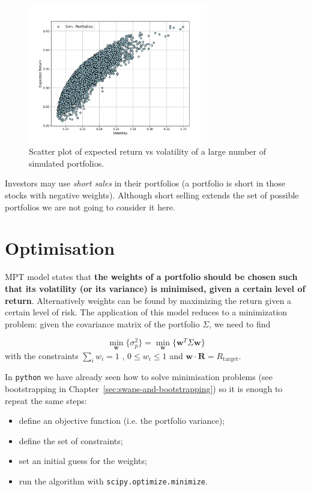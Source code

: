 \begin{figure}[hbtp]
\centering
\includegraphics[width=0.7\textwidth]{figures/return_variance}
\caption{Scatter plot of expected return vs volatility of a large number of simulated portfolios.}
\label{fig:mc_portfolio}
\end{figure}

Investors may use \emph{short sales} in their portfolios (a portfolio is short in those stocks with negative weights). 
Although short selling extends the set of possible portfolios we are not going to consider it here.

\section{Optimisation}\label{optimization}

MPT model states that \textbf{the weights of a portfolio should be chosen such that its volatility (or its variance) is minimised, given a certain level of return}. Alternatively weights can be found by maximizing the return given a certain level of risk. 
The application of this model reduces to a minimization problem: given the covariance matrix of the portfolio $\Sigma$, we need to find

\begin{equation}
\underset{\mathbf{w}}{\min}\{\sigma_p^2\} = \underset{\mathbf{w}}{\min}\{\mathbf{w}^T\Sigma\mathbf{w}\}
\end{equation}
with the constraints $\sum_{i}w_i = 1$ , $0 \le w_i \le 1$ and $\mathbf{w}\cdot\mathbf{R}=R_{\textrm{target}}$.

In \texttt{python} we have already seen how to solve minimisation problems (see bootstrapping in Chapter~\ref{sec:swaps-and-bootstrapping}) so it is enough to repeat the same steps:

\begin{itemize}
\tightlist
\item define an objective function (i.e. the portfolio variance);
\item define the set of constraints;
\item set an initial guess for the weights;
\item run the algorithm with \texttt{scipy.optimize.minimize}.
\end{itemize}

